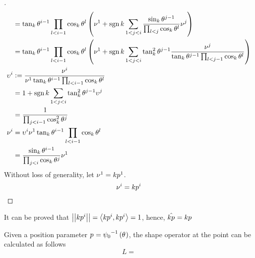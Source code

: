 \documentclass[../main.tex]{subfiles}
\begin{document}
\begin{proof}[]
\begin{align*}
        & =
        \tan_k\tensor{\theta}{^{i-1}}
        \prod_{l<{i-1}}{\cos_k\tensor{\theta}{^l}}
        \left(
            \tensor{\nu}{^1}
            +\sign{k}\sum_{1<j<i}{\frac{\sin_k\tensor{\theta}{^{j-1}}}{\prod_{l<j}{\cos_k\tensor{\theta}{^l}}}\tensor{\nu}{^j}}
        \right) \\
        & =
        \tan_k\tensor{\theta}{^{i-1}}
        \prod_{l<{i-1}}{\cos_k\tensor{\theta}{^l}}
        \left(
            \tensor{\nu}{^1}
            +\sign{k}\sum_{1<j<i}{
            \tan_k^2\tensor{\theta}{^{j-1}}
            \frac{\tensor{\nu}{^j}}{\tan_k\tensor{\theta}{^{j-1}}\prod_{l<{j-1}}{\cos_k\tensor{\theta}{^l}}}
            }
        \right) \\
        \tensor{\upsilon}{^i}
        & \defeq
        \frac{\tensor{\nu}{^i}}{\tensor{\nu}{^1}\tan_k\tensor{\theta}{^{i-1}}\prod_{l<{i-1}}{\cos_k\tensor{\theta}{^l}}} \\
        &=
        1
        +\sign{k}\sum_{1<j<i}{
        \tan_k^2\tensor{\theta}{^{j-1}}
        \tensor{\upsilon}{^j}
        } \\
        &= \frac{1}{\prod_{j<i-1}\cos_k^2\tensor{\theta}{^j}} \\
        \tensor{\nu}{^i}
        &=
        \tensor{\upsilon}{^i}
        \tensor{\nu}{^1}\tan_k\tensor{\theta}{^{i-1}}\prod_{l<{i-1}}{\cos_k\tensor{\theta}{^l}} \\
        &=
        \frac{\sin_k\tensor{\theta}{^{i-1}}}{\prod_{j<i}\cos_k\tensor{\theta}{^j}}
        \tensor{\nu}{^1}
    \end{align*}
    Without loss of generality, let $\tensor{\nu}{^1}=k\tensor{p}{^1}$.
    \begin{equation*}
        \tensor{\nu}{^i} = k\tensor{p}{^i} \qedhere
    \end{equation*}
\end{proof}
\begin{remark}
    It can be proved that $\norm{k\tensor{p}{^i}}=\inner{k\tensor{p}{^i}}{k\tensor{p}{^i}}=1$, hence, $\hat{k\tensor{p}{}}=k\tensor{p}{}$
\end{remark}
\begin{lemma}\label{M:ShapeOperator}
    Given a position parameter $\tensor{p}{}={\psi_0}^{-1}\left(\tensor{\theta}{}\right)$,
    the shape operator at the point can be calculated as follows
    \begin{equation*}
        L = 
    \end{equation*}
\end{lemma}
\end{document}
